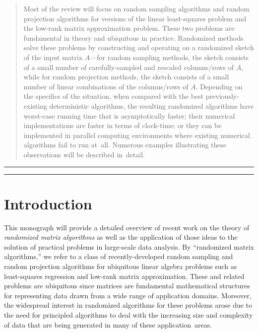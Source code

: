 \documentclass[twoside]{article}
\begin{document}
\begin{abstract}
Most of the review will focus on random sampling algorithms and random 
projection algorithms for versions of the linear least-squares problem and 
the low-rank matrix approximation problem.
These two problems are fundamental in theory and ubiquitous in practice.
Randomized methods solve these problems by constructing and operating on a 
randomized sketch of the input matrix $A$---for random sampling methods, the 
sketch consists of a small number of carefully-sampled and rescaled 
columns/rows of $A$, while for random projection methods, the sketch 
consists of a small number of linear combinations of the columns/rows of $A$.
Depending on the specifics of the situation, when compared with the best
previously-existing deterministic algorithms, the resulting randomized 
algorithms have worst-case running time that is asymptotically faster; their
numerical implementations are faster in terms of clock-time; or they can be 
implemented in parallel computing environments where existing numerical 
algorithms fail to run at~all.
Numerous examples illustrating these observations will be described in~detail.
\end{abstract}


\newpage
\rule{6in}{0.1mm}
\tableofcontents
\rule{6in}{0.1mm}
\newpage

\newpage

\section{Introduction}

This monograph will provide a detailed overview of recent work on the theory 
of \emph{randomized matrix algorithms} as well as the application of those 
ideas to the solution of practical problems in large-scale data analysis.
By ``randomized matrix algorithms,'' we refer to a class of 
recently-developed random sampling and random projection algorithms for 
ubiquitous linear algebra problems such as least-squares regression and 
low-rank matrix approximation.
These and related problems are ubiquitous since matrices are fundamental 
mathematical structures for representing data drawn from a wide range of 
application domains.
Moreover, the widespread interest in randomized algorithms for these 
problems arose due to the need for principled algorithms to deal with the 
increasing size and complexity of data that are being generated in many of 
these application~areas.
\end{document}
